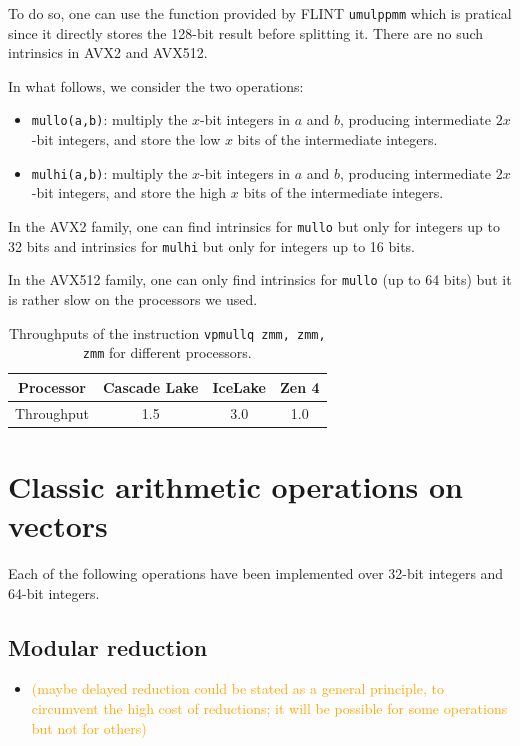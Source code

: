 \documentclass[a4paper]{article}
\begin{document}
To do so, one can use the function provided by FLINT \texttt{umulppmm} which is pratical since it directly stores the 128-bit result
before splitting it. There are no such intrinsics in AVX2 and AVX512.

In what follows, we consider the two operations:
\begin{itemize}
    \item \texttt{mullo(a,b)}: multiply the $x$-bit integers in $a$ and $b$, producing intermediate $2x$-bit integers, 
    and store the low $x$ bits of the intermediate integers.
    \item \texttt{mulhi(a,b)}: multiply the $x$-bit integers in $a$ and $b$, producing intermediate $2x$-bit integers, 
    and store the high $x$ bits of the intermediate integers.
\end{itemize}

In the AVX2 family, one can find intrinsics for \texttt{mullo} but only for integers up to 32 bits and intrinsics for 
\texttt{mulhi} but only for integers up to 16 bits.

In the AVX512 family, one can only find intrinsics for \texttt{mullo} (up to 64 bits) but it is rather slow on the processors we used.


\begin{table}[!h]
    \centering
    \begin{tabular}{|c|c|c|c|}
        \hline
        Processor & Cascade Lake & IceLake & Zen 4 \\
        \hline
        Throughput & 1.5 & 3.0 & 1.0 \\
        \hline
    \end{tabular}
    \caption{Throughputs of the instruction \texttt{vpmullq zmm, zmm, zmm} for different processors.}
\end{table}

\section{Classic arithmetic operations on vectors}

Each of the following operations have been implemented over 32-bit integers and 64-bit integers.

\subsection{Modular reduction}
\begin{itemize}
    \item \textcolor{orange}{(maybe delayed reduction could be stated as a general principle,
      to circumvent the high cost of reductions;
      it will be possible for some operations but not for others)}
\end{itemize}
\end{document}
